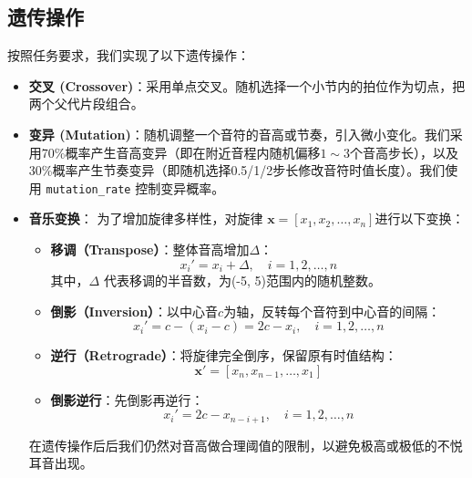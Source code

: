 \documentclass[12pt, a4paper]{ctexart}
\begin{document}
\subsection{遗传操作}
按照任务要求，我们实现了以下遗传操作：
\begin{itemize}
    \item \textbf{交叉 (Crossover)}：采用单点交叉。随机选择一个小节内的拍位作为切点，把两个父代片段组合。
    \item \textbf{变异 (Mutation)}：随机调整一个音符的音高或节奏，引入微小变化。我们采用70\%概率产生音高变异（即在附近音程内随机偏移$1 \sim 3$个音高步长），以及30\%概率产生节奏变异（即随机选择0.5/1/2步长修改音符时值长度）。我们使用 \verb|mutation_rate| 控制变异概率。
    \item \textbf{音乐变换}：
    为了增加旋律多样性，对旋律 $\mathbf{x} = [x_1, x_2, \dots, x_n]$进行以下变换：
    \begin{itemize}
        \item \textbf{移调（Transpose）}：整体音高增加$\Delta$：
            \begin{equation}
                x_i' = x_i + \Delta, \quad i = 1, 2, \dots, n \label{eq:trans}
            \end{equation}
其中，$\Delta$ 代表移调的半音数，为(-5, 5)范围内的随机整数。
        \item \textbf{倒影（Inversion）}：以中心音$c$为轴，反转每个音符到中心音的间隔：
            \begin{equation}
               x_i' = c - (x_i - c) = 2c - x_i, \quad i = 1,2,\dots,n
                \label{eq:inver}
            \end{equation}
        \item \textbf{逆行（Retrograde）}：将旋律完全倒序，保留原有时值结构：
            \begin{equation}
               \mathbf{x}' = [x_n, x_{n-1}, \dots, x_1]
                \label{eq:retro}
            \end{equation} 
        \item \textbf{倒影逆行}：先倒影再逆行：
            \begin{equation}
                x_i' = 2c - x_{n-i+1}, \quad i = 1,2,\dots,n
                \label{eq:invre}
            \end{equation} 
    \end{itemize}
    在遗传操作后后我们仍然对音高做合理阈值的限制，以避免极高或极低的不悦耳音出现。
\end{itemize}
\end{document}
